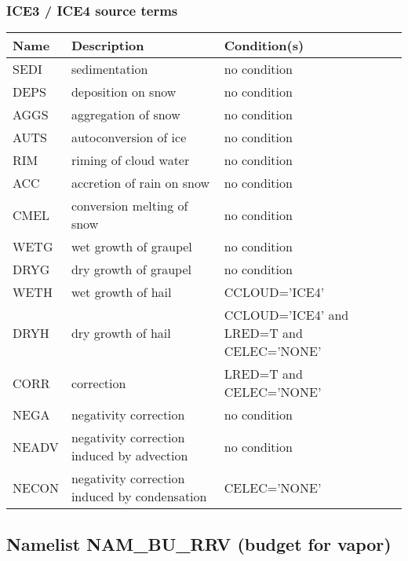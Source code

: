 \subsubsection{ICE3 / ICE4 source terms}

\begin{longtable} {|p{}|p{}|p{}|}
\hline
Name & Description & Condition(s) \\
\hline \hline
\endhead
SEDI   & sedimentation                                 & no condition \\\hline
DEPS   & deposition on snow                            & no condition \\\hline
AGGS   & aggregation of snow                           & no condition \\\hline
AUTS   & autoconversion of ice                         & no condition \\\hline
RIM    & riming of cloud water                         & no condition \\\hline
ACC    & accretion of rain on snow                     & no condition \\\hline
CMEL   & conversion melting of snow                    & no condition \\\hline
WETG   & wet growth of graupel                         & no condition \\\hline
DRYG   & dry growth of graupel                         & no condition \\\hline
WETH   & wet growth of hail                            & CCLOUD='ICE4' \\\hline
DRYH   & dry growth of hail                            & CCLOUD='ICE4' and LRED=T and CELEC='NONE' \\\hline
CORR   & correction                                    & LRED=T and CELEC='NONE' \\\hline
NEGA   & negativity correction                         & no condition \\\hline
NEADV  & negativity correction induced by advection    & no condition \\\hline
NECON  & negativity correction induced by condensation & CELEC='NONE' \\\hline
\end{longtable}


\subsection{Namelist NAM\_BU\_RRV (budget for  vapor)}


